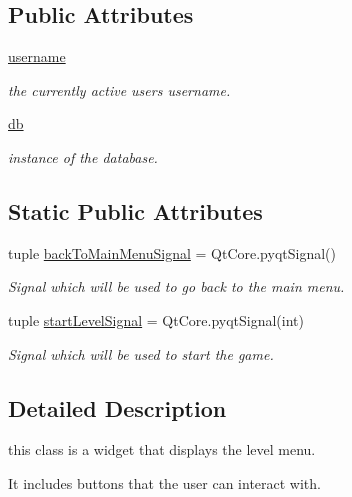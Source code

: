 \subsection*{Public Attributes}
\begin{DoxyCompactItemize}
\item 
\hyperlink{classsrc_1_1level__menu_1_1_level_menu_aee1d2148e23a2908c72c4a8f8ad0a98f}{username}
\begin{DoxyCompactList}\small\item\em the currently active user\textquotesingle{}s username. \end{DoxyCompactList}\item 
\hyperlink{classsrc_1_1level__menu_1_1_level_menu_a3224111dd78be1b15cc943f41daef0cf}{db}
\begin{DoxyCompactList}\small\item\em instance of the database. \end{DoxyCompactList}\end{DoxyCompactItemize}
\subsection*{Static Public Attributes}
\begin{DoxyCompactItemize}
\item 
tuple \hyperlink{classsrc_1_1level__menu_1_1_level_menu_a769225d8895542b2c7118110d7b2ff9d}{back\+To\+Main\+Menu\+Signal} = Qt\+Core.\+pyqt\+Signal()
\begin{DoxyCompactList}\small\item\em Signal which will be used to go back to the main menu. \end{DoxyCompactList}\item 
tuple \hyperlink{classsrc_1_1level__menu_1_1_level_menu_a14a5a5bd905bb0d8e732a33bed71ef44}{start\+Level\+Signal} = Qt\+Core.\+pyqt\+Signal(int)
\begin{DoxyCompactList}\small\item\em Signal which will be used to start the game. \end{DoxyCompactList}\end{DoxyCompactItemize}


\subsection{Detailed Description}
this class is a widget that displays the level menu. 

It includes buttons that the user can interact with. 

